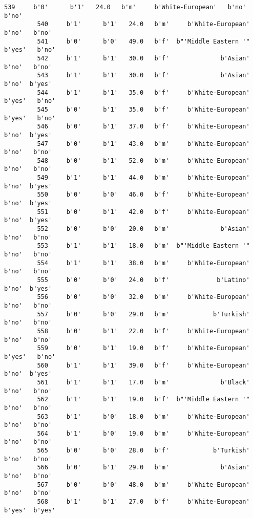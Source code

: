 \documentclass[11pt]{article}
\begin{document}
\begin{Verbatim}[commandchars=\\\{\}]
         539     b'0'      b'1'   24.0   b'm'     b'White-European'   b'no'   b'no'   
         540     b'1'      b'1'   24.0   b'm'     b'White-European'   b'no'   b'no'   
         541     b'0'      b'0'   49.0   b'f'  b"'Middle Eastern '"  b'yes'   b'no'   
         542     b'1'      b'1'   30.0   b'f'              b'Asian'   b'no'   b'no'   
         543     b'1'      b'1'   30.0   b'f'              b'Asian'   b'no'  b'yes'   
         544     b'1'      b'1'   35.0   b'f'     b'White-European'  b'yes'   b'no'   
         545     b'0'      b'1'   35.0   b'f'     b'White-European'  b'yes'   b'no'   
         546     b'0'      b'1'   37.0   b'f'     b'White-European'   b'no'  b'yes'   
         547     b'0'      b'1'   43.0   b'm'     b'White-European'   b'no'   b'no'   
         548     b'0'      b'1'   52.0   b'm'     b'White-European'   b'no'   b'no'   
         549     b'1'      b'1'   44.0   b'm'     b'White-European'   b'no'  b'yes'   
         550     b'0'      b'0'   46.0   b'f'     b'White-European'   b'no'  b'yes'   
         551     b'0'      b'1'   42.0   b'f'     b'White-European'   b'no'  b'yes'   
         552     b'0'      b'0'   20.0   b'm'              b'Asian'   b'no'   b'no'   
         553     b'1'      b'1'   18.0   b'm'  b"'Middle Eastern '"   b'no'   b'no'   
         554     b'1'      b'1'   38.0   b'm'     b'White-European'   b'no'   b'no'   
         555     b'0'      b'0'   24.0   b'f'             b'Latino'   b'no'  b'yes'   
         556     b'0'      b'0'   32.0   b'm'     b'White-European'   b'no'   b'no'   
         557     b'0'      b'0'   29.0   b'm'            b'Turkish'   b'no'   b'no'   
         558     b'0'      b'1'   22.0   b'f'     b'White-European'   b'no'   b'no'   
         559     b'0'      b'1'   19.0   b'f'     b'White-European'  b'yes'   b'no'   
         560     b'1'      b'1'   39.0   b'f'     b'White-European'   b'no'  b'yes'   
         561     b'1'      b'1'   17.0   b'm'              b'Black'   b'no'   b'no'   
         562     b'1'      b'1'   19.0   b'f'  b"'Middle Eastern '"   b'no'   b'no'   
         563     b'1'      b'0'   18.0   b'm'     b'White-European'   b'no'   b'no'   
         564     b'1'      b'0'   19.0   b'm'     b'White-European'   b'no'   b'no'   
         565     b'0'      b'0'   28.0   b'f'            b'Turkish'   b'no'   b'no'   
         566     b'0'      b'1'   29.0   b'm'              b'Asian'   b'no'   b'no'   
         567     b'0'      b'0'   48.0   b'm'     b'White-European'   b'no'   b'no'   
         568     b'1'      b'1'   27.0   b'f'     b'White-European'  b'yes'  b'yes'   

\end{Verbatim}
\end{document}
